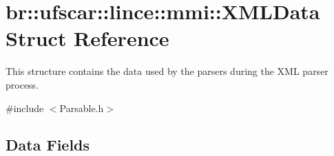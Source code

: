 \hypertarget{structbr_1_1ufscar_1_1lince_1_1mmi_1_1XMLData}{
\section{br::ufscar::lince::mmi::XMLData Struct Reference}
\label{structbr_1_1ufscar_1_1lince_1_1mmi_1_1XMLData}
}


This structure contains the data used by the parsers during the XML parser process.  




{\ttfamily \#include $<$Parsable.h$>$}

\subsection*{Data Fields}
